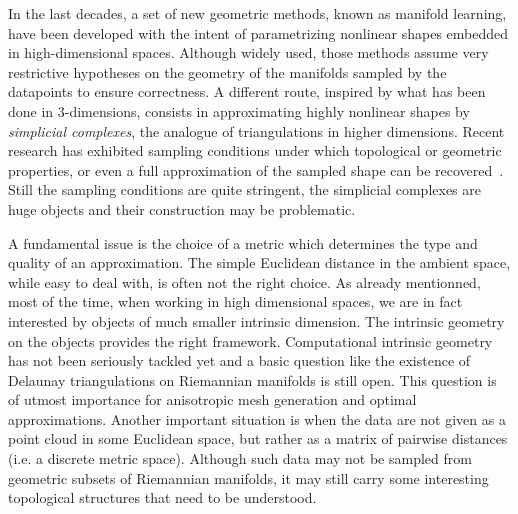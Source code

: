 
In the last decades, a set of new geometric methods, known as manifold learning, have been developed with the intent of parametrizing nonlinear shapes embedded in high-dimensional spaces. Although widely used, those methods  assume very restrictive hypotheses on the geometry of the manifolds sampled by the datapoints to ensure correctness. 
A different route, inspired by what has been done in 3-dimensions, consists in approximating highly nonlinear shapes by {\em simplicial complexes}, the analogue of triangulations in higher dimensions. Recent research has exhibited sampling conditions under which  topological or geometric properties, or even a full approximation of the sampled shape can be recovered~\cite{nsw-fhm-2008,geometrica-ccl09,geometrica-7142i}. Still the sampling conditions are quite stringent, the simplicial complexes are huge objects and their construction may be problematic.  

A fundamental issue is the choice of a metric which determines the type and quality of an approximation.
 The simple Euclidean distance in the ambient space, while easy to deal with, is often not the right choice.  As already mentionned, most of the time, when working in high dimensional spaces, we are in fact interested by objects of much smaller intrinsic dimension. The intrinsic geometry on the objects provides the right framework. Computational intrinsic geometry has not been seriously tackled yet and a basic question like the existence of  Delaunay triangulations on Riemannian manifolds is still open.  This question is of utmost importance for anisotropic mesh generation and optimal approximations. Another important situation is when the data are not given as a point cloud in some Euclidean space, but rather as a matrix of pairwise distances (i.e. a discrete metric space). Although such data may not be sampled from geometric subsets of Riemannian manifolds, it may still carry some interesting topological structures that need to be understood. 


